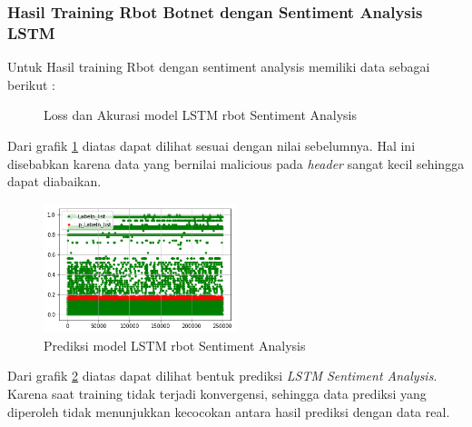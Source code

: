 \documentclass[./skripsi.tex]{subfiles}
\begin{document}
\subsubsection{Hasil Training Rbot Botnet dengan Sentiment Analysis LSTM}
\par Untuk Hasil training Rbot dengan sentiment analysis memiliki data sebagai berikut :

\begin{figure}[H]
    \centering
    \caption{Loss dan Akurasi model LSTM rbot Sentiment Analysis}
    \label{fig:lstms_rbot}
\end{figure}

\par Dari grafik \ref{fig:lstms_rbot} diatas dapat dilihat sesuai dengan nilai sebelumnya. Hal ini disebabkan karena data yang bernilai malicious pada \textit{header} sangat kecil sehingga dapat diabaikan.

\begin{figure}[H]
    \centering
    \includegraphics[width=0.5\textwidth]{public/assets/img/lstms_rbot_pred.png}
    \caption{Prediksi model LSTM rbot Sentiment Analysis}
    \label{fig:lstms_rbot_pred}
\end{figure}

\par Dari grafik \ref{fig:lstms_rbot_pred} diatas dapat dilihat bentuk prediksi \textit{LSTM Sentiment Analysis}. Karena saat training tidak terjadi konvergensi, sehingga data prediksi yang diperoleh tidak menunjukkan kecocokan antara hasil prediksi dengan data real.

\end{document}
